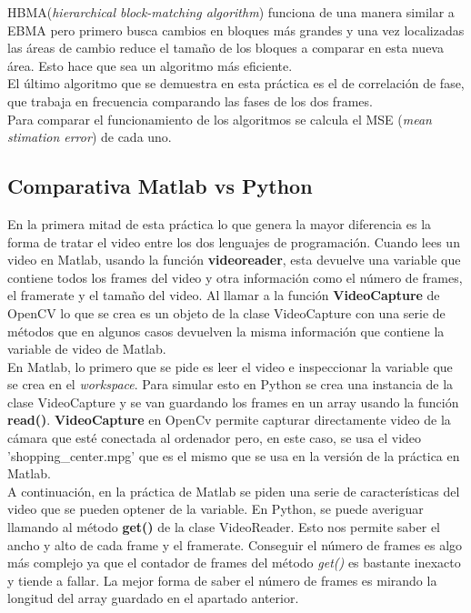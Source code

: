 \documentclass[a4paper,12pt]{report}
\begin{document}
HBMA(\emph{hierarchical block-matching algorithm}) funciona de una manera similar a EBMA pero primero busca cambios en bloques más grandes y una vez localizadas las áreas de cambio reduce el tamaño de los bloques a comparar en esta nueva área. Esto hace que sea un algoritmo más eficiente.\\

El último algoritmo que se demuestra en esta práctica es el de correlación de fase, que trabaja en frecuencia comparando las fases de los dos frames.\\

Para comparar el funcionamiento de los algoritmos se calcula el MSE (\emph{mean stimation error}) de cada uno.\\

\subsection{Comparativa Matlab vs Python}

En la primera mitad de esta práctica lo que genera la mayor diferencia es la forma de tratar el video entre los dos lenguajes de programación. Cuando lees un video en Matlab, usando la función \textbf{videoreader}, esta devuelve una variable que contiene todos los frames del video y otra información como el número de frames, el framerate y el tamaño del video. Al llamar a la función \textbf{VideoCapture} de OpenCV lo que se crea es un objeto de la clase VideoCapture con una serie de métodos que en algunos casos devuelven la misma información que contiene la variable de video de Matlab.\\

En Matlab, lo primero que se pide es leer el video e inspeccionar la variable que se crea en el \emph{workspace}. Para simular esto en Python se crea una instancia de la clase VideoCapture y se van guardando los frames en un array usando la función \textbf{read()}. \textbf{VideoCapture} en OpenCv permite capturar directamente video de la cámara que esté conectada al ordenador pero, en este caso, se usa el video 'shopping\_center.mpg' que es el mismo que se usa en la versión de la práctica en Matlab.\\

A continuación, en la práctica de Matlab se piden una serie de características del video que se pueden optener de la variable. En Python, se puede averiguar llamando al método \textbf{get()} de la clase VideoReader. Esto nos permite saber el ancho y alto de cada frame y el framerate. Conseguir el número de frames es algo más complejo ya que el contador de frames del método \emph{get()} es bastante inexacto y tiende a fallar. La mejor forma de saber el número de frames es mirando la longitud del array guardado en el apartado anterior.\\
\end{document}
